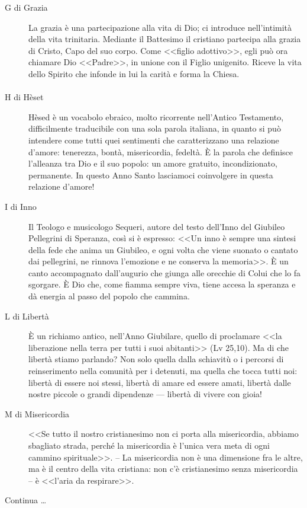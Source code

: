 \begin{description}
  \item[G di Grazia] La grazia è una partecipazione alla vita di Dio; ci introduce nell'intimità della vita trinitaria. Mediante il Battesimo il cristiano partecipa alla grazia di Cristo, Capo del suo corpo. Come <<figlio adottivo>>, egli può ora chiamare Dio <<Padre>>, in unione con il Figlio unigenito. Riceve la vita dello Spirito che infonde in lui la carità e forma la Chiesa.
\end{description}

\paragraph{}
\vspace*{-\parskip}

\begin{description}

  \item[H di Hèset] Hèsed è un vocabolo ebraico, molto ricorrente nell'Antico Testamento, difficilmente traducibile con una sola parola italiana, in quanto si può intendere come tutti quei sentimenti che caratterizzano una relazione d'amore: tenerezza, bontà, misericordia, fedeltà. È la parola che definisce l'alleanza tra Dio e il suo popolo: un amore gratuito, incondizionato, permanente. In questo Anno Santo lasciamoci coinvolgere in questa relazione d'amore!
\end{description}

\begin{description}
  \item[I di Inno] Il Teologo e musicologo Sequeri, autore del testo dell'Inno del Giubileo Pellegrini di Speranza, così si è espresso: <<Un inno è sempre una sintesi della fede che anima un Giubileo, e ogni volta che viene suonato o cantato dai pellegrini, ne rinnova l'emozione e ne conserva la memoria>>. È un canto accompagnato dall'augurio che giunga alle orecchie di Colui che lo fa sgorgare. È Dio che, come fiamma sempre viva, tiene accesa la speranza e dà energia al passo del popolo che cammina.

  \item[L di Libertà] È un richiamo antico, nell'Anno Giubilare, quello di proclamare <<la liberazione nella terra per tutti i suoi abitanti>> (Lv 25,10). Ma di che libertà stiamo parlando? Non solo quella dalla schiavitù o i percorsi di reinserimento nella comunità per i detenuti, ma quella che tocca tutti noi: libertà di essere noi stessi, libertà di amare ed essere amati, libertà dalle nostre piccole o grandi dipendenze --- libertà di vivere con gioia!

  \item[M di Misericordia] <<Se tutto il nostro cristianesimo non ci porta alla misericordia, abbiamo sbagliato strada, perché la misericordia è l'unica vera meta di ogni cammino spirituale>>. -- La misericordia non è una dimensione fra le altre, ma è il centro della vita cristiana: non c'è cristianesimo senza misericordia -- è <<l'aria da respirare>>.
\end{description}

Continua \ldots

